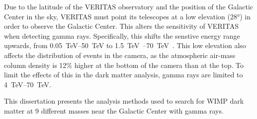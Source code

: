 Due to the latitude of the VERITAS observatory and the position of the Galactic Center in the sky, VERITAS must point its telescopes at a low elevation (\nicetilde\ang{28}) in order to observe the Galactic Center.
This alters the sensitivity of VERITAS when detecting gamma rays.
Specifically, this shifts the senstive energy range upwards, from \SIrange{0.05}{50}{\TeV} to \SIrange{1.5}{70}{\TeV{}}.
This low elevation also affects the distribution of events in the camera, as the atmospheric air-mass column density is 12\% higher at the bottom of the camera than at the top.
To limit the effects of this in the dark matter analysis, gamma rays are limited to \SIrange{4}{70}{\TeV}.

This dissertation presents the analysis methods used to search for WIMP dark matter at 9 different masses near the Galactic Center with \TeV{} gamma rays.



%


\cleartoevenpage[\thispagestyle{plain}]
\null
